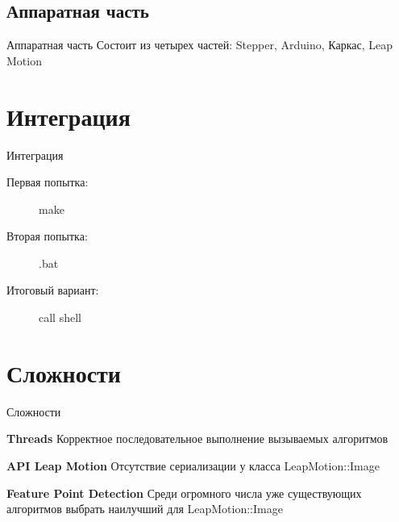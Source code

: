 \documentclass{beamer}
\newcommand{\cimg}[2]{%
	\begin{center}%
		\ifthenelse{\equal{#2}{}}{%
			\texttt{[image: \#1]}
		}{%
			\texttt{[image: \#1]}
		}%
	\end{center}%
}
\begin{document}
\subsection{Аппаратная часть}
\begin{frame}[t]{Аппаратная часть}
		Состоит из четырех частей: Stepper, Arduino, Каркас, Leap Motion
		\cimg{03.png}{0.5}
\end{frame}

\section{Интеграция}
\begin{frame}[t]{Интеграция}
	\begin{description}
		\item [Первая попытка:] make

		\item [Вторая попытка:] .bat

		\item [Итоговый вариант:] call shell
	\end{description}
\end{frame}

\section{Сложности}
\begin{frame}[t]{Сложности}
	\begin{description}
		\item \textbf{Threads} \newline Корректное последовательное выполнение вызываемых алгоритмов
	
		\item \textbf{API Leap Motion} \newline Отсутствие сериализации у класса LeapMotion::Image
	
		\item \textbf{Feature Point Detection} \newline Среди огромного числа уже существующих алгоритмов выбрать наилучший для LeapMotion::Image

	\end{description}
\end{frame}
\end{document}

